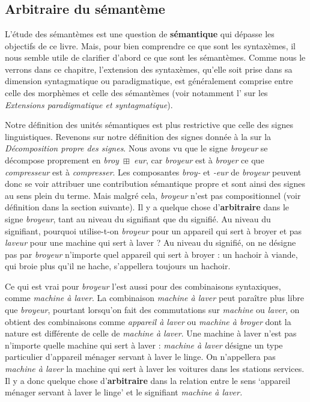 \chapter{}\label{sec:2.3}

\section{Arbitraire du sémantème}\label{sec:2.3.0}

L’étude des sémantèmes est une question de \textbf{sémantique} qui dépasse les objectifs de ce livre. Mais, pour bien comprendre ce que sont les syntaxèmes, il nous semble utile de clarifier d’abord ce que sont les sémantèmes. Comme nous le verrons dans ce chapitre, l’extension des syntaxèmes, qu’elle soit prise dans sa dimension syntagmatique ou paradigmatique, est généralement comprise entre celle des morphèmes et celle des sémantèmes (voir notamment l’ sur les \textit{Extensions paradigmatique et syntagmatique}).

Notre définition des unités sémantiques est plus restrictive que celle des signes linguistiques. Revenons sur notre définition des signes donnée à la  sur la \textit{Décomposition propre des signes}. Nous avons vu que le signe \textit{broyeur} se décompose proprement en \textit{broy~}${\boxplus}$\textit{~eur}, car \textit{broyeur} est à \textit{broyer} ce que \textit{compresseur} est à \textit{compresser}. Les composantes \textit{broy-} et \textit{{}-eur} de \textit{broyeur} peuvent donc se voir attribuer une contribution sémantique propre et sont ainsi des signes au sens plein du terme. Mais malgré cela, \textit{broyeur} n’est pas compositionnel (voir définition dans la section suivante). Il y a quelque chose d’\textbf{arbitraire} dans le signe \textit{broyeur}, tant au niveau du signifiant que du signifié. Au niveau du signifiant, pourquoi utilise-t-on \textit{broyeur} pour un appareil qui sert à broyer et pas \textit{laveur} pour une machine qui sert à laver ? Au niveau du signifié, on ne désigne pas par \textit{broyeur} n’importe quel appareil qui sert à broyer : un hachoir à viande, qui broie plus qu’il ne hache, s’appellera toujours un hachoir.

Ce qui est vrai pour \textit{broyeur} l’est aussi pour des combinaisons syntaxiques, comme \textit{machine à laver}. La combinaison \textit{machine à laver} peut paraître plus libre que \textit{broyeur}, pourtant lorsqu’on fait des commutations sur \textit{machine} ou \textit{laver}, on obtient des combinaisons comme \textit{appareil à laver} ou \textit{machine à broyer} dont la nature est différente de celle de \textit{machine à laver}. Une machine à laver n’est pas n’importe quelle machine qui sert à laver : \textit{machine à laver} désigne un type particulier d’appareil ménager servant à laver le linge. On n’appellera pas \textit{machine à laver} la machine qui sert à laver les voitures dans les stations services. Il y a donc quelque chose d’\textbf{arbitraire} dans la relation entre le sens ‘appareil ménager servant à laver le linge’ et le signifiant \textit{machine à laver.}

